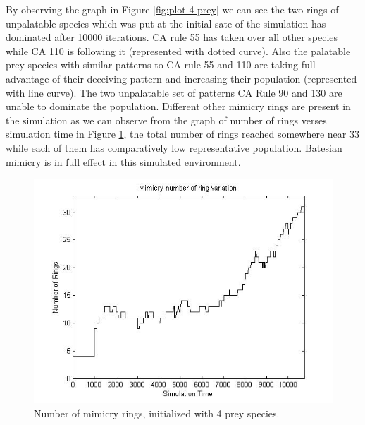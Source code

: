 By observing the graph in Figure \ref{fig:plot-4-prey} we can see the two rings of unpalatable species which was put at the initial sate of the simulation has dominated after 10000 iterations. CA rule 55 has taken over all other species while CA 110 is following it (represented with dotted curve). Also the palatable prey species with similar patterns to CA rule 55 and 110 are taking full advantage of their deceiving pattern and increasing their population (represented with line curve). The two unpalatable set of patterns CA Rule 90 and 130 are unable to dominate the population. Different other mimicry rings are present in the simulation as we can observe from the graph of number of rings verses simulation time in Figure \ref{fig:ringSize10k-4Prey}, the total number of rings reached somewhere near 33 while each of them has comparatively low representative population. Batesian mimicry is in full effect in this simulated environment.

\begin{figure}[H]
	\centering
	\includegraphics[scale=0.50]{images/ringSize10k-4Prey}
	\caption{Number of mimicry rings, initialized with 4 prey species.}
	\label{fig:ringSize10k-4Prey}
\end{figure}

